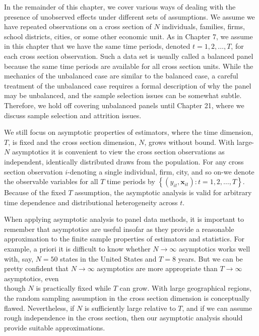 \documentclass[10pt]{article}
\begin{document}
In the remainder of this chapter, we cover various ways of dealing with the presence of unobserved effects under different sets of assumptions. We assume we have repeated observations on a cross section of $N$ individuals, families, firms, school districts, cities, or some other economic unit. As in Chapter 7, we assume in this chapter that we have the same time periods, denoted $t=1,2, \ldots, T$, for each cross section observation. Such a data set is usually called a balanced panel because the same time periods are available for all cross section units. While the mechanics of the unbalanced case are similar to the balanced case, a careful treatment of the unbalanced case requires a formal description of why the panel may be unbalanced, and the sample selection issues can be somewhat subtle. Therefore, we hold off covering unbalanced panels until Chapter 21, where we discuss sample selection and attrition issues.

We still focus on asymptotic properties of estimators, where the time dimension, $T$, is fixed and the cross section dimension, $N$, grows without bound. With large- $N$ asymptotics it is convenient to view the cross section observations as independent, identically distributed draws from the population. For any cross section observation $i$-denoting a single individual, firm, city, and so on-we denote the observable variables for all $T$ time periods by $\left\{\left(y_{i t}, \mathbf{x}_{i t}\right): t=1,2, \ldots, T\right\}$. Because of the fixed $T$ assumption, the asymptotic analysis is valid for arbitrary time dependence and distributional heterogeneity across $t$.

When applying asymptotic analysis to panel data methods, it is important to remember that asymptotics are useful insofar as they provide a reasonable approximation to the finite sample properties of estimators and statistics. For example, a priori it is difficult to know whether $N \rightarrow \infty$ asymptotics works well with, say, $N=50$ states in the United States and $T=8$ years. But we can be pretty confident that $N \rightarrow \infty$ asymptotics are more appropriate than $T \rightarrow \infty$ asymptotics, even\\
though $N$ is practically fixed while $T$ can grow. With large geographical regions, the random sampling assumption in the cross section dimension is conceptually flawed. Nevertheless, if $N$ is sufficiently large relative to $T$, and if we can assume rough independence in the cross section, then our asymptotic analysis should provide suitable approximations.
\end{document}
